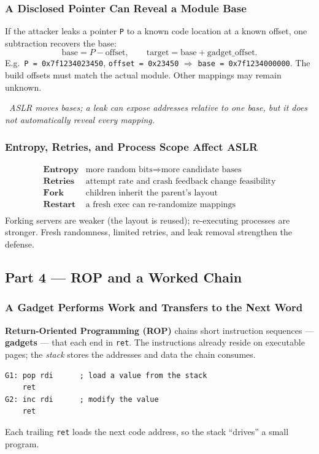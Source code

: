 \documentclass[hidelinks]{article}
\newcommand{\callout}[1]{\par\smallskip\noindent{\color{capri}$\blacktriangleright$}\ \textit{#1}\par\smallskip}
\begin{document}
\subsubsection{A Disclosed Pointer Can Reveal a Module Base}

If the attacker leaks a pointer \texttt{P} to a known code location at a known offset, one subtraction recovers the base:
\[
\text{base} = P - \text{offset}, \qquad \text{target} = \text{base} + \text{gadget\_offset}.
\]
E.g.\ \texttt{P = 0x7f1234023450}, \texttt{offset = 0x23450} $\Rightarrow$ \texttt{base = 0x7f1234000000}. The build offsets must match the actual module. Other mappings may remain unknown.

\callout{ASLR \emph{moves} bases; a leak can expose addresses relative to \emph{one} base, but it does not automatically reveal every mapping.}

\subsubsection{Entropy, Retries, and Process Scope Affect ASLR}

\[
\begin{array}{ll}
\textbf{Entropy}  & \text{more random bits} \Rightarrow \text{more candidate bases}\\
\textbf{Retries}  & \text{attempt rate and crash feedback change feasibility}\\
\textbf{Fork}     & \text{children inherit the parent's layout}\\
\textbf{Restart}  & \text{a fresh exec can re-randomize mappings}\\
\end{array}
\]
Forking servers are weaker (the layout is reused); re-executing processes are stronger. Fresh randomness, limited retries, and leak removal strengthen the defense.

\subsection{Part 4 --- ROP and a Worked Chain}

\subsubsection{A Gadget Performs Work and Transfers to the Next Word}

\textbf{Return-Oriented Programming (ROP)} chains short instruction sequences --- \textbf{gadgets} --- that each end in \texttt{ret}. The instructions already reside on executable pages; the \emph{stack} stores the addresses and data the chain consumes.
\begin{lstlisting}[language={[x86masm]Assembler}]
G1: pop rdi      ; load a value from the stack
    ret
G2: inc rdi      ; modify the value
    ret
\end{lstlisting}
Each trailing \texttt{ret} loads the next code address, so the stack ``drives'' a small program.
\end{document}
